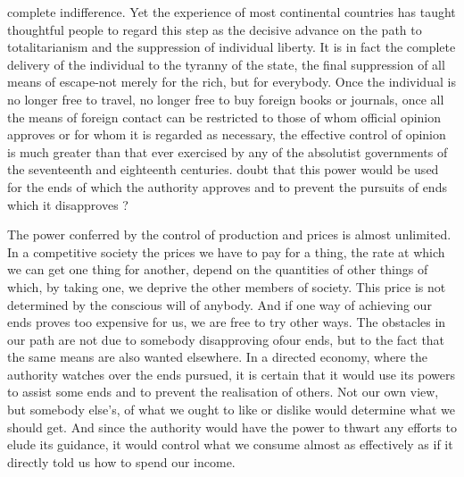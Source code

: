 \documentclass[11pt,openany]{book}
\begin{document}
complete indifference. Yet the experience of most continental countries has taught thoughtful people to regard this step as the decisive advance on the path to totalitarianism and the suppression of individual liberty. It is in fact the complete delivery of the individual to the tyranny of the state, the final suppression of all means of escape-not merely for the rich, but for everybody. Once the individual is no longer free to travel, no longer free to buy foreign books or journals, once all the means of foreign contact can be restricted to those of whom official opinion approves or for whom it is regarded as necessary, the effective control of opinion is much greater than that ever exercised by any of the absolutist governments of the seventeenth and eighteenth centuries. doubt that this power would be used for the ends of which the authority approves and to prevent the pursuits of ends which it disapproves ?

The power conferred by the control of production and prices is almost unlimited. In a competitive society the prices we have to pay for a thing, the rate at which we can get one thing for another, depend on the quantities of other things of which, by taking one, we deprive the other members of society. This price is not determined by the conscious will of anybody. And if one way of achieving our ends proves too expensive for us, we are free to try other ways. The obstacles in our path are not due to somebody disapproving ofour ends, but to the fact that the same means are also wanted elsewhere. In a directed economy, where the authority watches over the ends pursued, it is certain that it would use its powers to assist some ends and to prevent the realisation of others. Not our own view, but somebody else's, of what we ought to like or dislike would determine what we should get. And since the authority would have the power to thwart any efforts to elude its guidance, it would control what we consume almost as effectively as if it directly told us how to spend our income.

\begin{center}\textasteriskcentered\hspace{0.9em}\textasteriskcentered\hspace{0.9em}\textasteriskcentered\end{center}

\begin{center}\textasteriskcentered\hspace{0.9em}\textasteriskcentered\hspace{0.9em}\textasteriskcentered\end{center}
\end{document}
